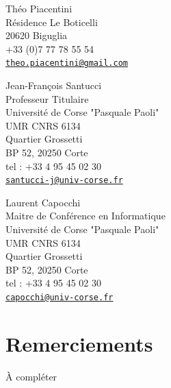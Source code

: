 \documentclass{rapport_stage}
\begin{document}
\maketitle
{}

\cleardoublepage

Théo Piacentini \\
Résidence Le Boticelli \\
20620 Biguglia \\
+33 (0)7 77 78 55 54 \\
\href{mailto:theo.piacentini@gmail.com}{\nolinkurl{theo.piacentini@gmail.com}}

\smallskip

Jean-François Santucci \\
Professeur Titulaire \\
Université de Corse "Pasquale Paoli"\\
UMR CNRS 6134\\
Quartier Grossetti\\
BP 52, 20250 Corte\\
tel : +33 4 95 45 02 30\\
\href{mailto:santucci-j@univ-corse.fr}{\nolinkurl{santucci-j@univ-corse.fr}}

\smallskip

Laurent Capocchi \\
Maitre de Conférence en Informatique \\
Université de Corse "Pasquale Paoli"\\
UMR CNRS 6134\\
Quartier Grossetti\\
BP 52, 20250 Corte\\
tel : +33 4 95 45 02 30\\
\href{mailto:capocchi@univ-corse.fr}{\nolinkurl{capocchi@univ-corse.fr}}

\cleardoublepage
{}
\section*{Remerciements}

{\color{black}
  À compléter
}

\clearpage
{}

\renewcommand{\baselinestretch}{0.5}\normalsize
\tableofcontents
\renewcommand{\baselinestretch}{1.0}\normalsize
\cleardoublepage

\setcounter{page}{1}
\end{document}

